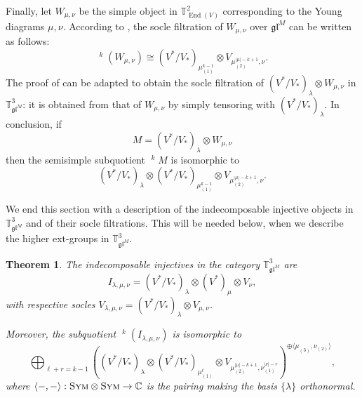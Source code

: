 \documentclass[11pt]{article}
\theoremstyle{plain}
\newtheorem{theorem}[lemma]{Theorem}
\theoremstyle{nonumberplain}
\theoremstyle{plain}
\theoremstyle{nonumberplain}
\newcommand\bC{{\mathbb C}}
\newcommand\bT{{\mathbb T}}
\newcommand\fgl{\mathfrak{gl}}
\DeclareMathOperator{\End}{\mathrm{End}}
\DeclareMathOperator{\usoc}{\underline{\mathrm{soc}}}
\newcommand{\cat}[1]{\textsc{#1}}
\begin{document}
Finally, let $W_{\mu,\nu}$ be the simple object in $\bT_{\End(V)}^2$ corresponding to the Young diagrams $\mu,\nu$. According to \cite[Corollary 5]{Chi14}, the socle filtration of $W_{\mu,\nu}$ over $\fgl^M$ can be written as follows:
\begin{equation*}
  \usoc^k(W_{\mu,\nu}) \cong (V^*/V_*)_{\mu_{(1)}^{k-1}}\otimes V_{\mu_{(2)}^{|\mu|-k+1},\nu}.
\end{equation*}
The proof of \cite[Corollary 5]{Chi14} can be adapted to obtain the socle filtration of $(V^*/V_*)_\lambda\otimes W_{\mu,\nu}$ in $\bT^3_{\fgl^M}$: it is obtained from that of $W_{\mu,\nu}$ by simply tensoring with $(V^*/V_*)_\lambda$. In conclusion, if 
\begin{equation*}
  M=(V^*/V_*)_\lambda\otimes W_{\mu,\nu}
\end{equation*}
then the semisimple subquotient $\usoc^k M$ is isomorphic to
\begin{equation}\label{eq:desc}
  (V^*/V_*)_\lambda\otimes (V^*/V_*)_{\mu_{(1)}^{k-1}}\otimes V_{\mu_{(2)}^{|\mu|-k+1},\nu}.
\end{equation}









We end this section with a description of the indecomposable injective objects in $\bT^3_{\fgl^M}$ and of their socle filtrations. This will be needed below, when we describe the higher ext-groups in $\bT^3_{\fgl^M}$. 





\begin{theorem}\label{th.soc_filt}
  The indecomposable injectives in the category $\bT^3_{\fgl^M}$ are 
  \begin{equation*}
    I_{\lambda,\mu,\nu}=(V^*/V_*)_\lambda\otimes (V^*)_{\mu}\otimes V_{\nu},
  \end{equation*}
with respective socles $V_{\lambda,\mu,\nu} = (V^*/V_*)_\lambda\otimes V_{\mu,\nu}$. 

Moreover, the subquotient $\usoc^k(I_{\lambda,\mu,\nu})$ is  isomorphic to
  \begin{equation*}
    \bigoplus_{\ell+r=k-1}\left((V^*/V_*)_\lambda\otimes (V^*/V_*)_{\mu_{(1)}^\ell}\otimes V_{\mu_{(2)}^{|\mu|-k+1},\nu_{(1)}^{|\nu|-r}}\right)^{\oplus \langle \mu_{(3)},\nu_{(2)}\rangle},
  \end{equation*}
where $\langle-,-\rangle:\cat{Sym}\otimes \cat{Sym}\to \bC$ is the pairing making the basis $\{\lambda\}$ orthonormal.  
\end{theorem}
\end{document}
